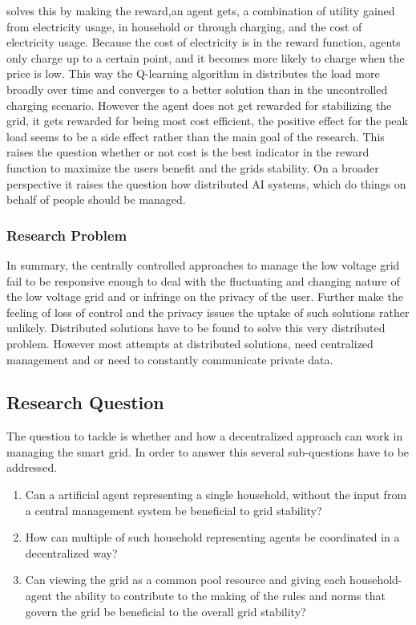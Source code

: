 \documentclass[a4paper]{article}
\begin{document}
\cite{reinforce_money} solves this by making the reward,an agent gets, a combination of
utility gained from electricity usage, in household or through charging, and the cost of electricity usage.  Because the cost of electricity is in the reward
function, agents only charge up to a certain point, and it becomes more likely to charge when the price is low. This way the Q-learning algorithm in \cite{reinforce_money} distributes
the load more broadly over time and converges to a better solution than in the uncontrolled charging scenario. However the agent does not get rewarded for stabilizing the grid, it gets
rewarded for being most cost efficient, the positive effect for the peak load seems to be a side effect rather than the main goal of the research.  
This raises the question whether or not cost is the best indicator in the 
reward function to maximize the users benefit and the grids stability. On a broader perspective it raises the question how distributed AI systems, which do things on behalf of people should be managed. \\ 
\subsubsection{Research Problem}
In summary, the centrally controlled approaches to manage the low voltage grid fail to be responsive enough to deal with the fluctuating and changing nature of the low voltage grid and or infringe on the privacy of the user. Further make the feeling of loss of control and the privacy issues the uptake of such solutions rather unlikely. Distributed solutions have to be found to solve this very distributed problem. However most attempts at distributed solutions, need centralized management and or need to constantly communicate private data.



\subsection{Research Question}
The question to tackle is whether and how a decentralized approach can work in managing the smart grid. In order to answer this several sub-questions have to be addressed. 
\begin{enumerate}
\item Can a artificial agent representing a single household, without the input from a central management system be beneficial to grid stability?
\item How can multiple of  such household representing agents be coordinated in a decentralized way?
\item Can viewing the grid as a common pool resource and giving each household-agent the ability to contribute to the making of the rules and norms that govern the grid be beneficial to the overall grid stability? 
\end{enumerate}
\end{document}
